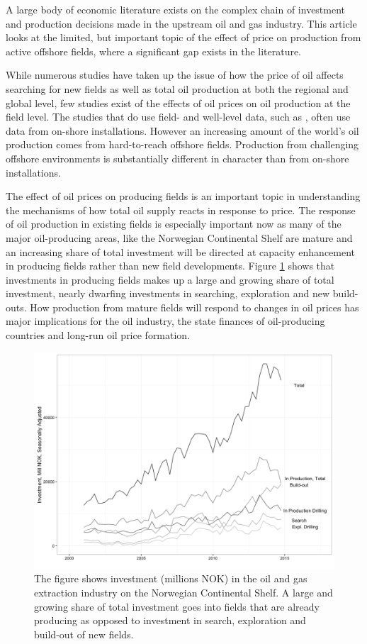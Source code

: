 \documentclass[12pt]{article}
\begin{document}
A large body of economic literature exists on the complex chain of investment and production decisions made in the upstream oil and gas industry. This article looks at the limited, but important topic of the effect of price on production from active offshore fields, where a significant gap exists in the literature.

While numerous studies have taken up the issue of how the price of oil affects searching for new fields as well as total oil production at both the regional and global level, few studies exist of the effects of oil prices on oil production at the field level. The studies that do use field- and well-level data, such as \citet{rao_taxation_2010}, often use data from on-shore installations.  However an increasing amount of the world's oil production comes from hard-to-reach offshore fields.  Production from challenging offshore environments is substantially different in character than from on-shore installations.

The effect of oil prices on producing fields is an important topic in understanding the mechanisms of how total oil supply reacts in response to price. The response of oil production in existing fields is especially important now as many of the major oil-producing areas, like the Norwegian Continental Shelf are mature and an increasing share of total investment will be directed at capacity enhancement in producing fields rather than new field developments. Figure \ref{investment} shows that investments in producing fields makes up a large and growing share of total investment, nearly dwarfing investments in searching, exploration and new build-outs. How production from mature fields will respond to changes in oil prices has major implications for the oil industry, the state finances of oil-producing countries and long-run oil price formation.

\begin{figure}
	\center
	\includegraphics[width=.9\textwidth]{figures/investment.png}
	\caption{The figure shows investment (millions NOK) in the oil and gas extraction industry on the Norwegian Continental Shelf. A large and growing share of total investment goes into fields that are already producing as opposed to investment in search, exploration and build-out of new fields.}
	\label{investment}
\end{figure} 
\end{document}
